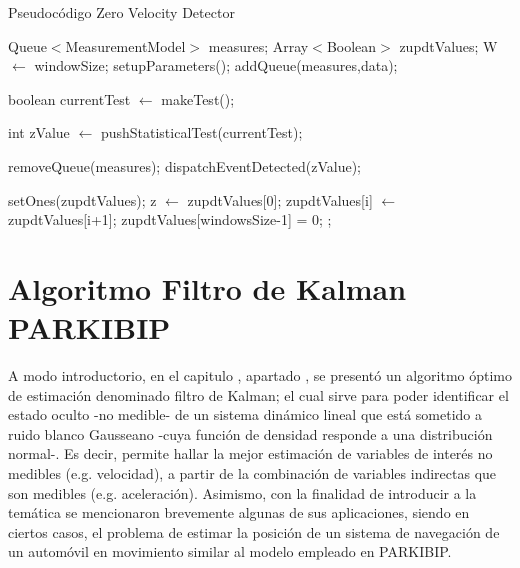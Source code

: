 \begin{algorithm}[H]
\caption{Pseudocódigo Zero Velocity Detector} \label{pseudo-code-detectors}
\begin{algorithmic}[1]
   \State Queue$<$MeasurementModel$>$ measures;
   \State Array$<$Boolean$>$ zupdtValues;
    \State W $\gets$  windowSize;
    \State setupParameters();
    \Statex
        \State addQueue(measures,data);
    
         

            \State boolean currentTest $\gets$  makeTest(); 

            \State int zValue $\gets$  pushStatisticalTest(currentTest); 
               
            \State removeQueue(measures);
            \State dispatchEventDetected(zValue); 
        \EndIf

    \EndFunction
    \Statex
    
            \State setOnes(zupdtValues); 
        \EndIf
        \State z $\gets$ zupdtValues[0];
           \State zupdtValues[i] $\gets$ zupdtValues[i+1];
        \EndFor
        \State zupdtValues[windowsSize-1] = 0;
        ;
   \EndFunction
\end{algorithmic}
\end{algorithm}

\section{Algoritmo Filtro de Kalman PARKIBIP}

A modo introductorio, en el capitulo , apartado , se presentó un algoritmo óptimo de estimación denominado filtro de Kalman; el cual sirve para poder identificar el estado oculto -no medible- de un sistema dinámico lineal que está sometido a ruido blanco Gausseano -cuya función de densidad responde a una distribución normal-. Es decir, permite hallar la mejor estimación de variables de interés no medibles (e.g. velocidad), a partir de la combinación de variables indirectas que son medibles (e.g. aceleración). Asimismo, con la finalidad de introducir a la temática se mencionaron brevemente algunas de sus aplicaciones, siendo en ciertos casos, el problema de estimar la posición de un sistema de navegación de un automóvil en movimiento similar al modelo empleado en PARKIBIP.

